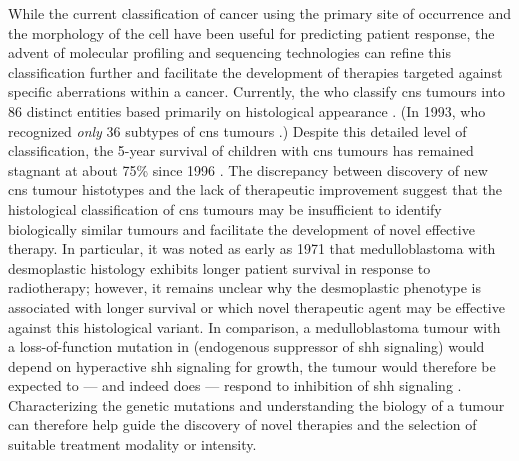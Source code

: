 While the current classification of cancer using the primary site of occurrence and the morphology of the cell have been useful for predicting patient response, the advent of molecular profiling and sequencing technologies can refine this classification further and facilitate the development of therapies targeted against specific aberrations within a cancer. Currently, the \gls{who} classify \gls{cns} tumours into 86 distinct entities based primarily on histological appearance . (In 1993, \gls{who} recognized \emph{only} 36 subtypes of \gls{cns} tumours .) Despite this detailed level of classification, the 5-year survival of children with \gls{cns} tumours has remained stagnant at about 75\% since 1996 . The discrepancy between discovery of new \gls{cns} tumour histotypes and the lack of therapeutic improvement suggest that the histological classification of \gls{cns} tumours may be insufficient to identify biologically similar tumours and facilitate the development of novel effective therapy. In particular, it was noted as early as 1971 that medulloblastoma with desmoplastic histology exhibits longer patient survival  in response to radiotherapy; however, it remains unclear why the desmoplastic phenotype is associated with longer survival or which novel therapeutic agent may be effective against this histological variant. In comparison, a medulloblastoma tumour with a loss-of-function mutation in  (endogenous suppressor of \gls{shh} signaling) would depend on hyperactive \gls{shh} signaling for growth, the tumour would therefore be expected to --- and indeed does --- respond to inhibition of \gls{shh} signaling . Characterizing the genetic mutations and understanding the biology of a tumour can therefore help guide the discovery of novel therapies and the selection of suitable treatment modality or intensity.

